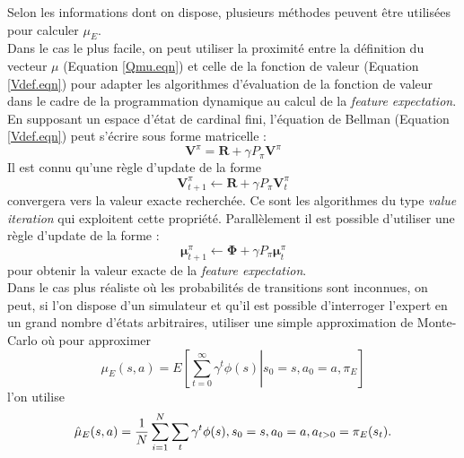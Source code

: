 \documentclass[publibook-draft]{CAp2012}
\begin{document}
Selon les informations dont on dispose, plusieurs méthodes peuvent être utilisées pour calculer $\mu_E$.\\

Dans le cas le plus facile, on peut utiliser la proximité entre la définition du vecteur $\mu$ (Equation \eqref{Qmu.eqn}) et celle de la fonction de valeur (Equation \eqref{Vdef.eqn}) pour adapter les algorithmes d'évaluation de la fonction de valeur dans le cadre de la programmation dynamique au calcul de la {\it feature expectation}.\\
En supposant un espace d'état de cardinal fini, l'équation de Bellman (Equation \eqref{Vdef.eqn}) peut s'écrire sous forme matricelle :
\begin{equation}
\mathbf V^\pi = \mathbf R + \gamma P_\pi\mathbf V^\pi
\end{equation}
Il est connu qu'une règle d'update de la forme 
\begin{equation}
\mathbf V^\pi_{t+1} \leftarrow \mathbf R + \gamma P_\pi\mathbf V^\pi_t
\end{equation}
convergera vers la valeur exacte recherchée. Ce sont les algorithmes du type \emph{value iteration} qui exploitent cette propriété. Parallèlement il est possible d'utiliser une règle d'update de la forme :
\begin{equation}
\mathbf \mu^\pi_{t+1} \leftarrow \mathbf\Phi + \gamma P_\pi\mathbf\mu^\pi_t
\end{equation}
pour obtenir la valeur exacte de la {\it feature expectation}.\\

Dans le cas plus réaliste où les probabilités de transitions sont inconnues, on peut, si l'on dispose d'un simulateur et qu'il est possible d'interroger l'expert en un grand nombre d'états arbitraires, utiliser une simple approximation de Monte-Carlo où pour approximer 
\begin{equation}
\mu_E(s,a) = E\left.\left[\sum\limits_{t=0}^\infty \gamma^t \phi(s)\right|s_0 = s, a_0 = a, \pi_E\right]
\end{equation}
 l'on utilise
\begin{equation}
\hat\mu_E(s,a) = {1\over N}\sum\limits_{i=1}^{N}\sum\limits_{t}\gamma^t\phi(s), s_0=s, a_0=a, a_{t>0} = \pi_E(s_t).
\end{equation}
\end{document}
